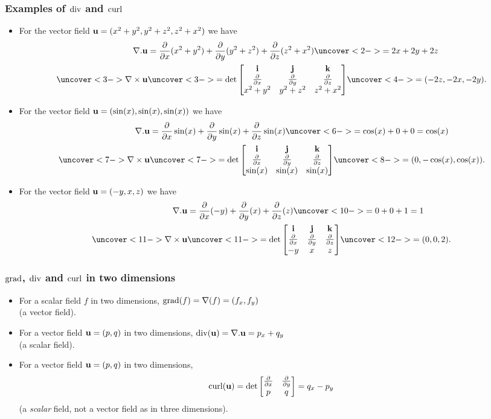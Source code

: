 \documentclass[9pt]{beamer}
\begin{document}
\begin{frame}[t]
 \frametitle{Examples of $\operatorname{div}$ and $\operatorname{curl}$}

 \begin{itemize}
  \item<1->[(a)] For the vector field $\mathbf{u}=(x^2+y^2,y^2+z^2,z^2+x^2)$ we
   have 
   \begin{align*}
    \nabla.\vu &= \ddx(x^2+y^2) + \ddy(y^2+z^2) + \ddz(z^2+x^2) 
      \uc<2->{= 2x+2y+2z} \\
    \uc<3->{\nabla\tm\vu} &\uc<3->{=
     \det\bbm \vi & \vj & \vk \\
              \ddx & \ddy & \ddz \\
              x^2+y^2 & y^2+z^2 & z^2+x^2 \ebm }
     \uc<4->{= (-2z,-2x,-2y). }
   \end{align*}
  \item<5->[(b)] For the vector field $\mathbf{u}=(\sin(x),\sin(x),\sin(x))$
   we have
   \begin{align*}
    \nabla.\vu &= \ddx\sin(x) + 
                  \ddy\sin(x) + 
                  \ddz\sin(x) 
      \uc<6->{= \cos(x)+0+0 = \cos(x)} \\
    \uc<7->{\nabla\tm\vu} &\uc<7->{= 
     \det\bbm \vi & \vj & \vk \\
              \ddx & \ddy & \ddz \\
              \sin(x) & \sin(x) & \sin(x) \ebm }
     \uc<8->{= (0,-\cos(x),\cos(x)). }
   \end{align*}
  \item<9->[(c)] For the vector field $\mathbf{u}=(-y,x,z)$ we have
   \begin{align*}
    \nabla.\vu &= \ddx(-y) + \ddy(x) + \ddz(z) 
      \uc<10->{= 0+0+1=1} \\
    \uc<11->{\nabla\tm\vu} &\uc<11->{= 
     \det\bbm \vi & \vj & \vk \\
              \ddx & \ddy & \ddz \\
              -y & x & z \ebm}\uc<12->{ = (0,0,2).} 
   \end{align*}
 \end{itemize}
\end{frame}


\begin{frame}[t]
 \frametitle{$\operatorname{grad}$, $\operatorname{div}$ and $\operatorname{curl}$ in two dimensions}
 \begin{itemize}
  \item<1->[(a)] For a scalar field $f$ in two dimensions,
   $\operatorname{grad}(f)=\nabla(f)=(f_x,f_y)$\\ (a vector field).
  \item<2->[(b)] For a vector field $\mathbf{u}=(p,q)$ in two dimensions, 
   $\operatorname{div}(\mathbf{u})=\nabla.\mathbf{u}=p_x+q_y$\\ (a scalar field).
  \item<3->[(c)] For a vector field $\mathbf{u}=(p,q)$ in two dimensions, 
   \[ \operatorname{curl}(\mathbf{u})= \det\left[\begin{matrix} \frac{\partial}{\partial x} & \frac{\partial}{\partial y} \\ p & q \end{matrix}\right] = q_x-p_y \]
   (a \emph{scalar} field, not a vector field as in three dimensions).
 \end{itemize}
\end{frame}
\end{document}
